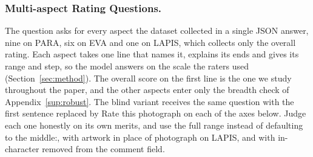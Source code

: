 \documentclass[runningheads]{llncs}
\newcommand{\pt}[1]{{\ttfamily\footnotesize #1}}
\begin{document}
\begin{sloppypar}
\subsubsection{Multi-aspect Rating Questions.} The question asks for every aspect the dataset collected in a single JSON answer, nine on PARA, six on EVA and one on LAPIS, which collects only the overall rating. Each aspect takes one line that names it, explains its ends and gives its range and step, so the model answers on the scale the raters used (Section~\ref{sec:method}). The overall score on the first line is the one we study throughout the paper, and the other aspects enter only the breadth check of Appendix~\ref{sup:robust}. The blind variant receives the same question with the first sentence replaced by \pt{Rate this photograph on each of the axes below. Judge each one honestly on its own merits, and use the full range instead of defaulting to the middle:}, with \pt{artwork} in place of \pt{photograph} on LAPIS, and with \pt{in-character} removed from the comment field.
\end{sloppypar}
\end{document}
